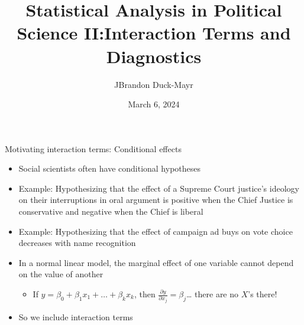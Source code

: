 \documentclass[
  ignorenonframetext,
]{beamer}
\title{Statistical Analysis in Political Science II:\newline Interaction Terms and Diagnostics}
\author{JBrandon Duck-Mayr}
\date{March 6, 2024}
\providecommand{\tightlist}{%
  \setlength{\itemsep}{0pt}\setlength{\parskip}{0pt}}
\newcommand{\setsep}{\setlength{\itemsep}{3pt}}
\newcommand{\setskip}{\setlength{\parskip}{3pt}}
\renewcommand{\tightlist}{\setsep\setskip}
\begin{document}
\frame{\titlepage}

\begin{frame}{Motivating interaction terms: Conditional effects}
\protect\hypertarget{motivating-interaction-terms-conditional-effects}{}
\pause

\begin{itemize}[<+->]
\tightlist
\item
  Social scientists often have conditional hypotheses
\item
  Example: Hypothesizing that the effect of a Supreme Court justice's ideology on their interruptions in oral argument is positive when the Chief Justice is conservative and negative when the Chief is liberal
\item
  Example: Hypothesizing that the effect of campaign ad buys on vote choice decreases with name recognition
\item
  In a normal linear model, the marginal effect of one variable cannot depend on the value of another

  \begin{itemize}[<+->]
  \tightlist
  \item
    If \(y = \beta_0 + \beta_1 x_1 + \dots + \beta_k x_k\), then \(\ensuremath{\frac{\partial{y}}{\partial{x_j}}} = \beta_j\)\ldots{} there are no \(X\)'s there!
  \end{itemize}
\item
  So we include interaction terms
\end{itemize}
\end{frame}
\end{document}
